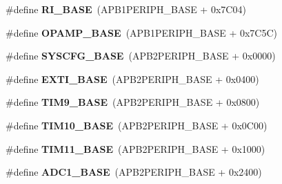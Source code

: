 \begin{DoxyCompactItemize}
\item 
\hypertarget{group___peripheral__memory__map_ga8fdc749e6f184b3cd9b01f179af62e4c}{\#define {\bfseries R\-I\-\_\-\-B\-A\-S\-E}~(A\-P\-B1\-P\-E\-R\-I\-P\-H\-\_\-\-B\-A\-S\-E + 0x7\-C04)}\label{group___peripheral__memory__map_ga8fdc749e6f184b3cd9b01f179af62e4c}

\item 
\hypertarget{group___peripheral__memory__map_ga6e9722d15c7ed794f0eca9682f64c03c}{\#define {\bfseries O\-P\-A\-M\-P\-\_\-\-B\-A\-S\-E}~(A\-P\-B1\-P\-E\-R\-I\-P\-H\-\_\-\-B\-A\-S\-E + 0x7\-C5\-C)}\label{group___peripheral__memory__map_ga6e9722d15c7ed794f0eca9682f64c03c}

\item 
\hypertarget{group___peripheral__memory__map_ga62246020bf3b34b6a4d8d0e84ec79d3d}{\#define {\bfseries S\-Y\-S\-C\-F\-G\-\_\-\-B\-A\-S\-E}~(A\-P\-B2\-P\-E\-R\-I\-P\-H\-\_\-\-B\-A\-S\-E + 0x0000)}\label{group___peripheral__memory__map_ga62246020bf3b34b6a4d8d0e84ec79d3d}

\item 
\hypertarget{group___peripheral__memory__map_ga87371508b3bcdcd98cd1ec629be29061}{\#define {\bfseries E\-X\-T\-I\-\_\-\-B\-A\-S\-E}~(A\-P\-B2\-P\-E\-R\-I\-P\-H\-\_\-\-B\-A\-S\-E + 0x0400)}\label{group___peripheral__memory__map_ga87371508b3bcdcd98cd1ec629be29061}

\item 
\hypertarget{group___peripheral__memory__map_ga92ae902be7902560939223dd765ece08}{\#define {\bfseries T\-I\-M9\-\_\-\-B\-A\-S\-E}~(A\-P\-B2\-P\-E\-R\-I\-P\-H\-\_\-\-B\-A\-S\-E + 0x0800)}\label{group___peripheral__memory__map_ga92ae902be7902560939223dd765ece08}

\item 
\hypertarget{group___peripheral__memory__map_ga3eff32f3801db31fb4b61d5618cad54a}{\#define {\bfseries T\-I\-M10\-\_\-\-B\-A\-S\-E}~(A\-P\-B2\-P\-E\-R\-I\-P\-H\-\_\-\-B\-A\-S\-E + 0x0\-C00)}\label{group___peripheral__memory__map_ga3eff32f3801db31fb4b61d5618cad54a}

\item 
\hypertarget{group___peripheral__memory__map_ga3a4a06bb84c703084f0509e105ffaf1d}{\#define {\bfseries T\-I\-M11\-\_\-\-B\-A\-S\-E}~(A\-P\-B2\-P\-E\-R\-I\-P\-H\-\_\-\-B\-A\-S\-E + 0x1000)}\label{group___peripheral__memory__map_ga3a4a06bb84c703084f0509e105ffaf1d}

\item 
\hypertarget{group___peripheral__memory__map_ga695c9a2f892363a1c942405c8d351b91}{\#define {\bfseries A\-D\-C1\-\_\-\-B\-A\-S\-E}~(A\-P\-B2\-P\-E\-R\-I\-P\-H\-\_\-\-B\-A\-S\-E + 0x2400)}\label{group___peripheral__memory__map_ga695c9a2f892363a1c942405c8d351b91}


\end{DoxyCompactItemize}
